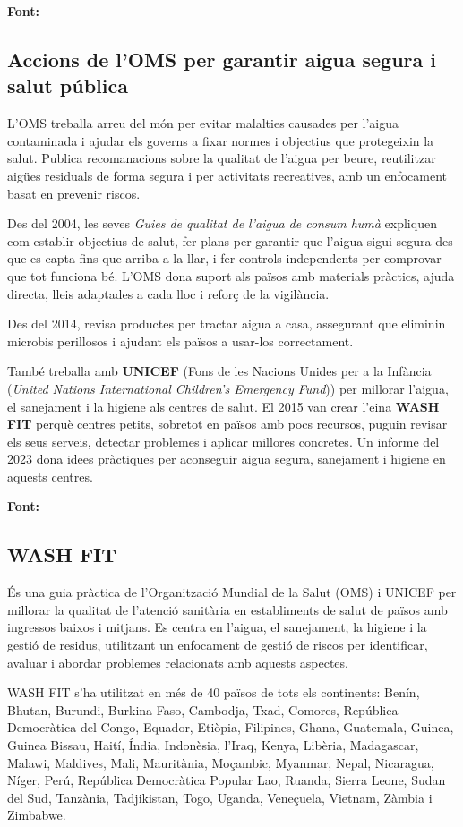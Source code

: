 \textbf{Font:}~\cite{OMS2}

\subsection{Accions de l’OMS per garantir aigua segura i salut pública}
L’OMS treballa arreu del món per evitar malalties causades per l’aigua contaminada i ajudar els governs a fixar normes i objectius que protegeixin la salut. Publica recomanacions sobre la qualitat de l’aigua per beure, reutilitzar aigües residuals de forma segura i per activitats recreatives, amb un enfocament basat en prevenir riscos.

Des del 2004, les seves \textit{Guies de qualitat de l’aigua de consum humà} expliquen com establir objectius de salut, fer plans per garantir que l’aigua sigui segura des que es capta fins que arriba a la llar, i fer controls independents per comprovar que tot funciona bé. L’OMS dona suport als països amb materials pràctics, ajuda directa, lleis adaptades a cada lloc i reforç de la vigilància.

Des del 2014, revisa productes per tractar aigua a casa, assegurant que eliminin microbis perillosos i ajudant els països a usar-los correctament.

També treballa amb \textbf{UNICEF} (Fons de les Nacions Unides per a la Infància (\textit{United Nations International Children's Emergency Fund})) per millorar l’aigua, el sanejament i la higiene als centres de salut. El 2015 van crear l’eina \textbf{WASH FIT} perquè centres petits, sobretot en països amb pocs recursos, puguin revisar els seus serveis, detectar problemes i aplicar millores concretes. Un informe del 2023 dona idees pràctiques per aconseguir aigua segura, sanejament i higiene en aquests centres.

\textbf{Font:}~\cite{OMS2}

\subsection{WASH FIT}
És una guia pràctica de l’Organització Mundial de la Salut (OMS) i UNICEF per millorar la qualitat de l’atenció sanitària en establiments de salut de països amb ingressos baixos i mitjans. Es centra en l’aigua, el sanejament, la higiene i la gestió de residus, utilitzant un enfocament de gestió de riscos per identificar, avaluar i abordar problemes relacionats amb aquests aspectes.

WASH FIT s’ha utilitzat en més de 40 països de tots els continents:
Benín, Bhutan, Burundi, Burkina Faso, Cambodja, Txad, Comores, República Democràtica del Congo, Equador, Etiòpia, Filipines, Ghana, Guatemala, Guinea, Guinea Bissau, Haití, Índia, Indonèsia, l’Iraq, Kenya, Libèria, Madagascar, Malawi, Maldives, Mali, Mauritània, Moçambic, Myanmar, Nepal, Nicaragua, Níger, Perú, República Democràtica Popular Lao, Ruanda, Sierra Leone, Sudan del Sud, Tanzània, Tadjikistan, Togo, Uganda, Veneçuela, Vietnam, Zàmbia i Zimbabwe.


